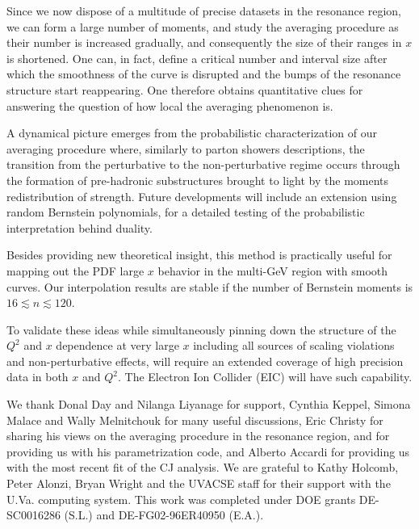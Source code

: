 \documentclass[
twocolumn,
aps,prd,
nofootinbib,
superscriptaddress,
showpacs,ligh
tightenlines, 
]{revtex4}
\begin{document}
Since we now dispose of a multitude of precise datasets in the resonance region, we can  
form a large number of moments, and study the averaging procedure as their number is increased gradually, and consequently the size of their ranges in $x$ is shortened. One can, in fact, define a critical number and interval size after which the smoothness of the curve is disrupted and the bumps of the resonance structure start reappearing. One therefore obtains quantitative clues for answering the question of how local the averaging phenomenon is. 

A dynamical picture emerges from the probabilistic characterization of our averaging procedure where, similarly to parton showers descriptions, the transition from the perturbative to the non-perturbative regime occurs through the formation of pre-hadronic substructures brought to light by the moments redistribution of strength. Future developments will include an extension using random Bernstein polynomials, for a detailed testing of the probabilistic interpretation behind duality. 

Besides providing new theoretical insight, this method is practically useful for mapping out the PDF large $x$ behavior in the multi-GeV region with smooth curves. Our interpolation results are stable if the number of Bernstein moments is $16 \lesssim n \lesssim 120$.  

To validate these ideas while simultaneously pinning down the structure of the $Q^2$ and $x$ dependence at very large $x$ including all sources of scaling violations and non-perturbative effects, will require an extended coverage of high precision data in both $x$ and $Q^2$. The Electron Ion Collider (EIC) will have such capability. 

\acknowledgements
We thank Donal Day and Nilanga Liyanage for support, Cynthia Keppel, Simona Malace and Wally Melnitchouk for many useful discussions, Eric Christy for sharing his views on the averaging procedure in the resonance region, and for providing us with his parametrization code, and Alberto Accardi for providing us with the most recent fit of the CJ analysis. We are grateful to Kathy Holcomb, Peter Alonzi, Bryan Wright and the UVACSE staff for their support with the U.Va. computing system. This work was completed under DOE grants DE-SC0016286 (S.L.) and DE-FG02-96ER40950 (E.A.).
\end{document}
